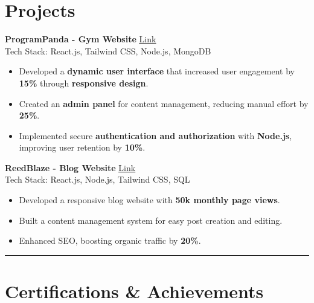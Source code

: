 \documentclass[a4paper,10pt]{article}
\newcommand{\sectdivider}{\noindent\rule{\linewidth}{0.5pt}}
\begin{document}
\section*{\color{myblue} Projects}
\noindent
\textbf{ProgramPanda - Gym Website} \hfill \href{https://www.programpanda.co/}{\underline{Link}} \\
Tech Stack: React.js, Tailwind CSS, Node.js, MongoDB  
\begin{itemize}
    \item Developed a \textbf{dynamic user interface} that increased user engagement by \textbf{15\%} through \textbf{responsive design}.
    \item Created an \textbf{admin panel} for content management, reducing manual effort by \textbf{25\%}.
    \item Implemented secure \textbf{authentication and authorization} with \textbf{Node.js}, improving user retention by \textbf{10\%}.
\end{itemize}
\vspace{0em}
\noindent
\textbf{ReedBlaze - Blog Website} \hfill \href{https://reedblaze.com}{\underline{Link}} \\
Tech Stack: React.js, Node.js, Tailwind CSS, SQL
\begin{itemize}
    \item Developed a responsive blog website with \textbf{50k monthly page views}.
    \item Built a content management system for easy post creation and editing.
    \item Enhanced SEO, boosting organic traffic by \textbf{20\%}.
\end{itemize}

\sectdivider
\vspace{-0.4em}

\section*{\color{myblue} Certifications \& Achievements}
\end{document}
